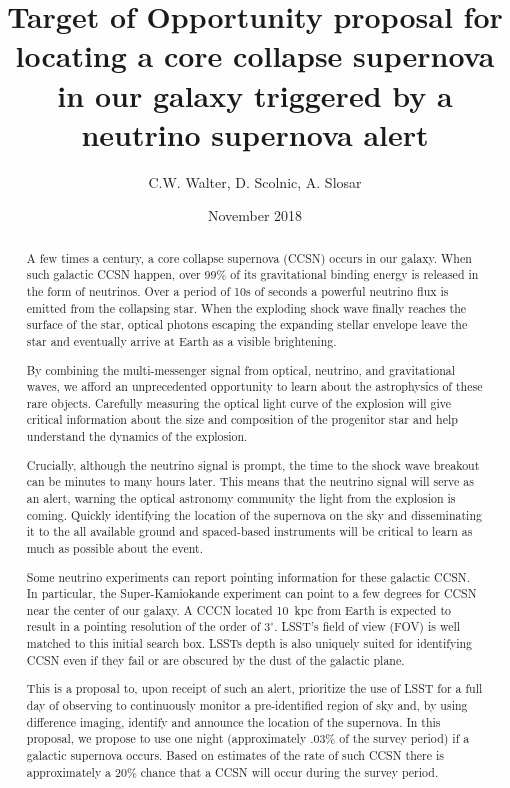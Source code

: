 \documentclass[12pt, letterpaper]{article}
\title{Target of Opportunity proposal for locating a core collapse
  supernova in our galaxy triggered by a neutrino supernova alert}
\author{ C.W. Walter, D. Scolnic, A. Slosar}
\date{ November 2018}
\begin{document}
\maketitle

\begin{abstract}

  A few times a century, a core collapse supernova (CCSN) occurs in
  our galaxy. When such galactic CCSN happen, over 99\% of its
  gravitational binding energy is released in the form of neutrinos.
  Over a period of 10s of seconds a powerful neutrino flux is emitted
  from the collapsing star.  When the exploding shock wave finally
  reaches the surface of the star, optical photons escaping the
  expanding stellar envelope leave the star and eventually arrive at
  Earth as a visible brightening.

  By combining the multi-messenger signal from optical, neutrino, and
  gravitational waves, we afford an unprecedented opportunity to learn
  about the astrophysics of these rare objects. Carefully measuring
  the optical light curve of the explosion will give critical
  information about the size and composition of the progenitor star
  and help understand the dynamics of the explosion.

  Crucially, although the neutrino signal is prompt, the time to the
  shock wave breakout can be minutes to many hours later.  This means
  that the neutrino signal will serve as an alert, warning the
  optical astronomy community the light from the explosion is coming.  
  Quickly identifying the location of the supernova on the sky and
  disseminating it to the all available ground and spaced-based
  instruments will be critical to learn as much as possible about the
  event.

  Some neutrino experiments can report pointing information for these
  galactic CCSN. In particular, the Super-Kamiokande experiment can
  point to a few degrees for CCSN near the center of our galaxy.  A
  CCCN located 10~kpc from Earth is expected to result in a pointing
  resolution of the order of $3^\circ$.  LSST's field of view (FOV) is
  well matched to this initial search box.  LSSTs depth is also
  uniquely suited for identifying CCSN even if they fail or are
  obscured by the dust of the galactic plane.

  This is a proposal to, upon receipt of such an alert, prioritize the
  use of LSST for a full day of observing to continuously monitor a
  pre-identified region of sky and, by using difference imaging,
  identify and announce the location of the supernova. In this
  proposal, we propose to use one night (approximately .03\% of the
  survey period) if a galactic supernova occurs.  Based on estimates
  of the rate of such CCSN there is approximately a 20\% chance that a
  CCSN will occur during the survey period.
  
\end{abstract}
\end{document}
